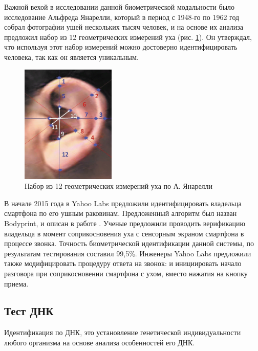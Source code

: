 \documentclass[14pt, a4paper]{extarticle}
\begin{document}

Важной вехой в исследовании данной биометрической модальности было исследование Альфреда Янарелли, который в период с 1948-го по 1962 год собрал фотографии ушей нескольких тысяч человек, и на основе их анализа предложил набор из 12 геометрических измерений уха (рис. \ref{img:ear}). Он утверждал, что используя этот набор измерений можно достоверно идентифицировать человека, так как он является уникальным.

\begin{center}
	\begin{figure}[h!]
		\centering
		\includegraphics[width=0.4\textwidth]{ear.png}
		\caption{Набор из 12 геометрических измерений уха по А. Янарелли}
		\label{img:ear}
	\end{figure}
\end{center}
\vspace{-1cm}

В начале 2015 года в Yahoo Labs предложили идентифицировать владельца смартфона по его ушным раковинам. Предложенный алгоритм был назван Bodyprint, и описан в работе \cite{holz2015bodyprint}. Ученые предложили проводить верификацию владельца в момент соприкосновения уха с сенсорным экраном смартфона в процессе звонка. Точность биометрической идентификации данной системы, по результатам тестирования составил 99,5\%. Инженеры Yahoo Labs предложили также модифицировать процедуру ответа на звонок: и инициировать начало разговора при соприкосновении смартфона с ухом, вместо нажатия на кнопку приема.

\subsection{Тест ДНК}
Идентификация по ДНК, это установление генетической индивидуальности любого организма на основе анализа особенностей его ДНК. 
\end{document}
